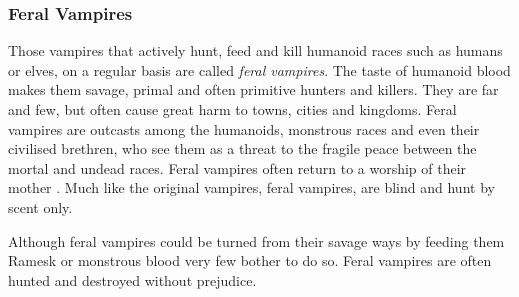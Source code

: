 \subsubsection{Feral Vampires}
\label{sec:Feral Vampires}

Those vampires that actively hunt, feed and kill humanoid races such as
humans or elves, on a regular basis are called \emph{feral vampires}. The
taste of humanoid blood makes them savage, primal and often primitive hunters
and killers. They are far and few, but often cause great harm to towns, cities
and kingdoms. Feral vampires are outcasts among the humanoids, monstrous races
and even their civilised brethren, who see them as a threat to the fragile
peace between the mortal and undead races. Feral vampires often return to a
worship of their mother . Much like the original vampires,
feral vampires, are blind and hunt by scent only.

Although feral vampires could be turned from their savage ways by feeding them
Ramesk or monstrous blood very few bother to do so. Feral vampires are often
hunted and destroyed without prejudice.

